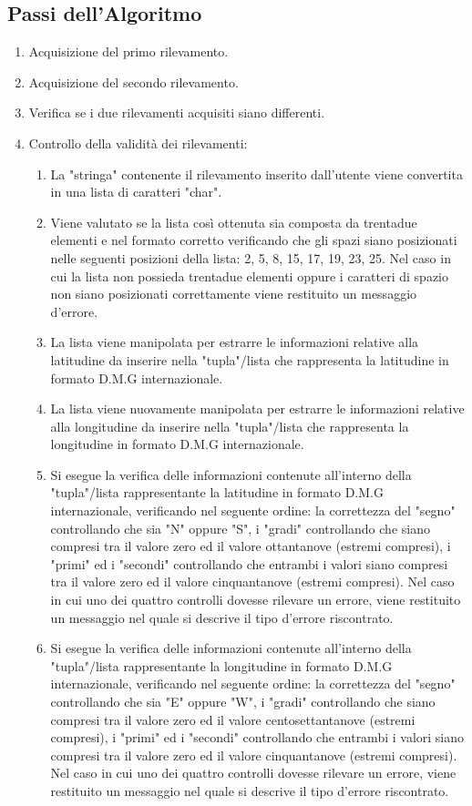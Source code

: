 \documentclass{article}
\begin{document}
\subsection{Passi dell'Algoritmo}
\begin{enumerate}
	\item Acquisizione del primo rilevamento.
	\item Acquisizione del secondo rilevamento.
	\item Verifica se i due rilevamenti acquisiti siano differenti.
	
	\item Controllo della validità dei rilevamenti:
	\begin{enumerate}
		\item La "stringa" contenente il rilevamento inserito dall'utente viene convertita in una lista di caratteri "char".
		\item Viene valutato se la lista così ottenuta sia composta da trentadue elementi e nel formato corretto verificando che gli spazi siano posizionati nelle  seguenti posizioni della lista: 2, 5, 8, 15, 17, 19, 23, 25. Nel caso in cui la lista non possieda trentadue elementi oppure i caratteri di spazio non siano posizionati correttamente viene restituito un messaggio d'errore.
		\item La lista viene manipolata per estrarre le informazioni relative alla latitudine da inserire nella "tupla"/lista che rappresenta la latitudine in formato D.M.G internazionale.
		\item La lista viene nuovamente manipolata per estrarre le informazioni relative alla longitudine da inserire nella "tupla"/lista che rappresenta la longitudine in formato D.M.G internazionale.
		\item Si esegue la verifica delle informazioni contenute all'interno della "tupla"/lista rappresentante la latitudine in formato D.M.G internazionale, verificando nel seguente ordine:  la correttezza del "segno" controllando che sia "N" oppure "S", i "gradi" controllando che siano compresi tra il valore zero ed il valore ottantanove (estremi compresi), i "primi" ed i "secondi" controllando che entrambi i valori siano compresi tra il valore zero ed il valore cinquantanove (estremi compresi). Nel caso in cui uno dei quattro controlli dovesse rilevare un errore, viene restituito un messaggio nel quale si descrive il tipo d'errore riscontrato.
		\item Si esegue la verifica delle informazioni contenute all'interno della "tupla"/lista rappresentante la longitudine in formato D.M.G internazionale, verificando nel seguente ordine:  la correttezza del "segno" controllando che sia "E" oppure "W", i "gradi" controllando che siano compresi tra il valore zero ed il valore centosettantanove (estremi compresi), i "primi" ed i "secondi" controllando che entrambi i valori siano compresi tra il valore zero ed il valore cinquantanove (estremi compresi). Nel caso in cui uno dei quattro controlli dovesse rilevare un errore, viene restituito un messaggio nel quale si descrive il tipo d'errore riscontrato.
	\end{enumerate}


\end{enumerate}
\end{document}
